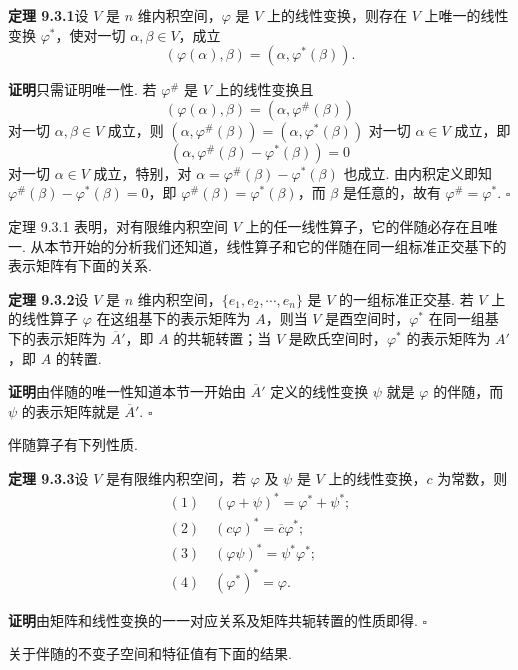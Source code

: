\documentclass[UTF8,12pt,a4paper,fontset=fandol]{ctexart}
\begin{document}
\noindent\textbf{定理 9.3.1}\quad 设 $V$ 是 $n$ 维内积空间，$\varphi$ 是 $V$ 上的线性变换，则存在 $V$ 上唯一的线性变换 $\varphi^*$，使对一切 $\alpha,\beta\in V$，成立
\begin{equation}
  (\varphi(\alpha),\beta)=(\alpha,\varphi^*(\beta)).
  \tag{9.3.2}
\end{equation}

\noindent\textbf{证明}\quad 只需证明唯一性. 若 $\varphi^\#$ 是 $V$ 上的线性变换且
\[
  (\varphi(\alpha),\beta)=(\alpha,\varphi^\#(\beta))
\]
对一切 $\alpha,\beta\in V$ 成立，则 $(\alpha,\varphi^\#(\beta))=(\alpha,\varphi^*(\beta))$ 对一切 $\alpha\in V$ 成立，即
\[
  (\alpha,\varphi^\#(\beta)-\varphi^*(\beta))=0
\]
对一切 $\alpha\in V$ 成立，特别，对 $\alpha=\varphi^\#(\beta)-\varphi^*(\beta)$ 也成立. 由内积定义即知 $\varphi^\#(\beta)-\varphi^*(\beta)=0$，即 $\varphi^\#(\beta)=\varphi^*(\beta)$，而 $\beta$ 是任意的，故有 $\varphi^\#=\varphi^*$. $\square$

定理 9.3.1 表明，对有限维内积空间 $V$ 上的任一线性算子，它的伴随必存在且唯一. 从本节开始的分析我们还知道，线性算子和它的伴随在同一组标准正交基下的表示矩阵有下面的关系.

\noindent\textbf{定理 9.3.2}\quad 设 $V$ 是 $n$ 维内积空间，$\{e_1,e_2,\cdots,e_n\}$ 是 $V$ 的一组标准正交基. 若 $V$ 上的线性算子 $\varphi$ 在这组基下的表示矩阵为 $A$，则当 $V$ 是酉空间时，$\varphi^*$ 在同一组基下的表示矩阵为 $\overline A'$，即 $A$ 的共轭转置；当 $V$ 是欧氏空间时，$\varphi^*$ 的表示矩阵为 $A'$，即 $A$ 的转置.

\noindent\textbf{证明}\quad 由伴随的唯一性知道本节一开始由 $\overline A'$ 定义的线性变换 $\psi$ 就是 $\varphi$ 的伴随，而 $\psi$ 的表示矩阵就是 $\overline A'$. $\square$

伴随算子有下列性质.

\noindent\textbf{定理 9.3.3}\quad 设 $V$ 是有限维内积空间，若 $\varphi$ 及 $\psi$ 是 $V$ 上的线性变换，$c$ 为常数，则
\[
\begin{gathered}
  (1)\quad (\varphi+\psi)^*=\varphi^*+\psi^*;\\
  (2)\quad (c\varphi)^*=\overline c\varphi^*;\\
  (3)\quad (\varphi\psi)^*=\psi^*\varphi^*;\\
  (4)\quad (\varphi^*)^*=\varphi.
\end{gathered}
\]

\noindent\textbf{证明}\quad 由矩阵和线性变换的一一对应关系及矩阵共轭转置的性质即得. $\square$

关于伴随的不变子空间和特征值有下面的结果.
\end{document}
